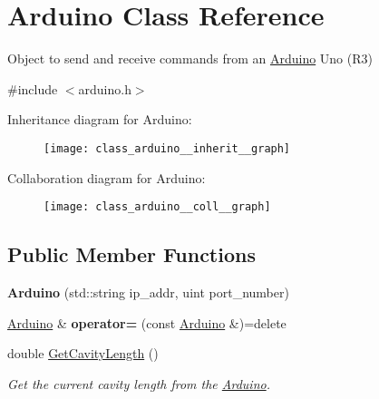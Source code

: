 \hypertarget{class_arduino}{}\section{Arduino Class Reference}
\label{class_arduino}


Object to send and receive commands from an \hyperlink{class_arduino}{Arduino} Uno (R3)  




{\ttfamily \#include $<$arduino.\+h$>$}



Inheritance diagram for Arduino\+:\nopagebreak
\begin{figure}[H]
\begin{center}
\leavevmode
\texttt{[image: class\_arduino\_\_inherit\_\_graph]}
\end{center}
\end{figure}


Collaboration diagram for Arduino\+:\nopagebreak
\begin{figure}[H]
\begin{center}
\leavevmode
\texttt{[image: class\_arduino\_\_coll\_\_graph]}
\end{center}
\end{figure}
\subsection*{Public Member Functions}
\begin{DoxyCompactItemize}
\item 
{\bfseries Arduino} (std\+::string ip\+\_\+addr, uint port\+\_\+number)\hypertarget{class_arduino_a92c95a8b8c1022d0145da24d53a1db7b}{}\label{class_arduino_a92c95a8b8c1022d0145da24d53a1db7b}

\item 
\hyperlink{class_arduino}{Arduino} \& {\bfseries operator=} (const \hyperlink{class_arduino}{Arduino} \&)=delete\hypertarget{class_arduino_a73d294f82c38557d1872cadd372c0b8b}{}\label{class_arduino_a73d294f82c38557d1872cadd372c0b8b}

\item 
double \hyperlink{class_arduino_a0ae462174c61881ccd5f78af5130eceb}{Get\+Cavity\+Length} ()
\begin{DoxyCompactList}\small\item\em Get the current cavity length from the \hyperlink{class_arduino}{Arduino}. \end{DoxyCompactList}\end{DoxyCompactItemize}

